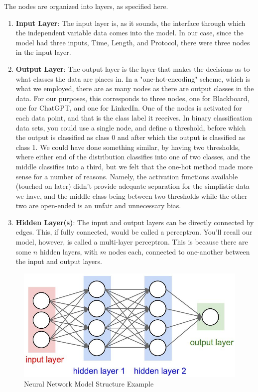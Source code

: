 \documentclass[10pt,sigconf,letterpaper,nonacm]{acmart}
\begin{document}
The nodes are organized into layers, as specified here.
\begin{enumerate}
    \item {\bf Input Layer}: The input layer is, as it sounds, the interface through which the independent variable data comes into the model. 
    In our case, since the model had three inputs, Time, Length, and Protocol, there were three nodes in the input layer.
    \item {\bf Output Layer}: The output layer is the layer that makes the decisions as to what classes the data are places in. In a "one-hot-encoding" scheme, which is what we employed, there are as many nodes as there are output classes in the data. For our purposes, this corresponds to three nodes, one for Blackboard, one for ChatGPT, and one for LinkedIn. One of the nodes is activated for each data point, and that is the class label it receives.
    In binary classification data sets, you could use a single node, and define a threshold, before which the output is classified as class 0 and after which the output is classified as class 1.
    We could have done something similar, by having two thresholds, where either end of the distribution classifies into one of two classes, and the middle classifies into a third, but we felt that the one-hot method made more sense for a number of reasons.
    Namely, the activation functions available (touched on later) didn't provide adequate separation for the simplistic data we have, 
    and the middle class being between two thresholds while the other two are open-ended is an unfair and unnecessary bias.
    \item {\bf Hidden Layer(s)}: The input and output layers can be directly connected by edges. 
    This, if fully connected, would be called a perceptron. 
    You'll recall our model, however, is called a multi-layer perceptron. 
    This is because there are some $n$ hidden layers, with $m$ nodes each, connected to one-another between the input and output layers.
\end{enumerate}
\begin{figure}
    \centering
    \includegraphics[width=1\linewidth]{Figures_and_Graphs/nn_example.png}
    \caption{Neural Network Model Structure Example}
    \label{fig:nn}
\end{figure}
\end{document}
